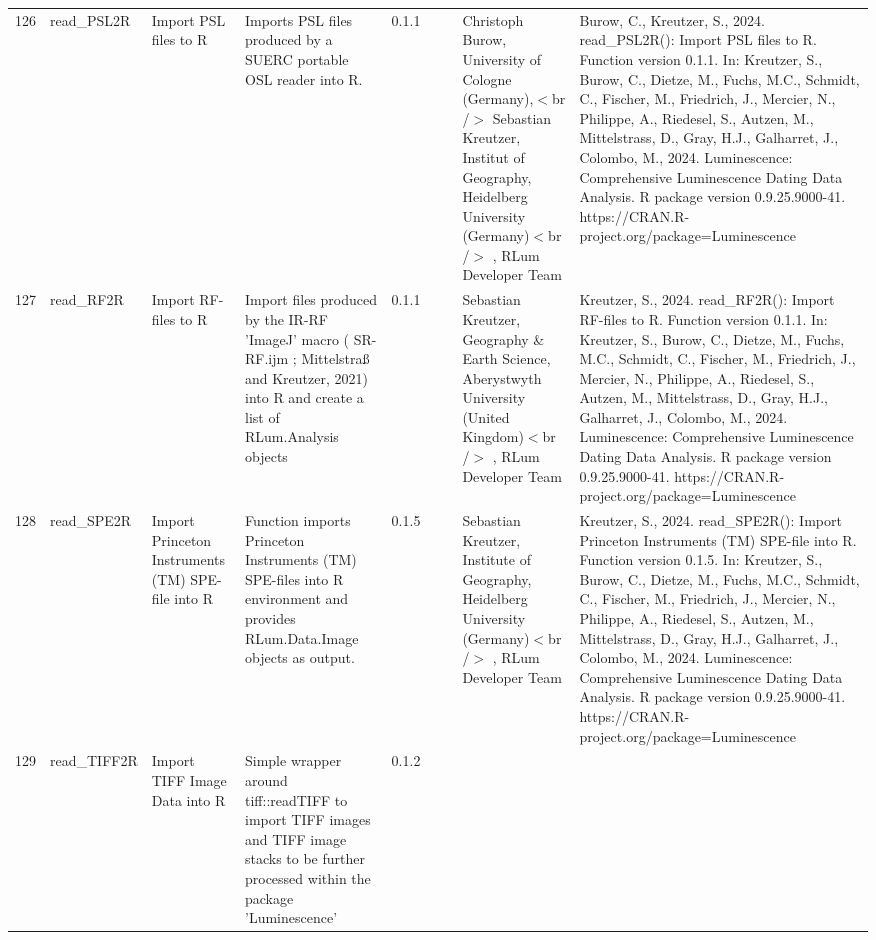 \begin{table}[ht]
\begin{tabular}{rllllllll}
 \\ 
  126 & read\_PSL2R & Import PSL files to R & Imports PSL files produced by a SUERC portable OSL reader into R. & 0.1.1
 &  &  & Christoph Burow, University of Cologne (Germany),$<$br /$>$ Sebastian Kreutzer, Institut of Geography, Heidelberg University (Germany)$<$br /$>$ , RLum Developer Team & Burow, C., Kreutzer, S., 2024. read\_PSL2R(): Import PSL files to R. Function version 0.1.1. In: Kreutzer, S., Burow, C., Dietze, M., Fuchs, M.C., Schmidt, C., Fischer, M., Friedrich, J., Mercier, N., Philippe, A., Riedesel, S., Autzen, M., Mittelstrass, D., Gray, H.J., Galharret, J., Colombo, M., 2024. Luminescence: Comprehensive Luminescence Dating Data Analysis. R package version 0.9.25.9000-41. https://CRAN.R-project.org/package=Luminescence
 \\ 
  127 & read\_RF2R & Import RF-files to R & Import files produced by the IR-RF 'ImageJ' macro ( SR-RF.ijm ; Mittelstraß and Kreutzer, 2021) into R and create a list of  RLum.Analysis  objects & 0.1.1
 &  &  & Sebastian Kreutzer, Geography \& Earth Science, Aberystwyth University (United Kingdom)$<$br /$>$ , RLum Developer Team & Kreutzer, S., 2024. read\_RF2R(): Import RF-files to R. Function version 0.1.1. In: Kreutzer, S., Burow, C., Dietze, M., Fuchs, M.C., Schmidt, C., Fischer, M., Friedrich, J., Mercier, N., Philippe, A., Riedesel, S., Autzen, M., Mittelstrass, D., Gray, H.J., Galharret, J., Colombo, M., 2024. Luminescence: Comprehensive Luminescence Dating Data Analysis. R package version 0.9.25.9000-41. https://CRAN.R-project.org/package=Luminescence
 \\ 
  128 & read\_SPE2R & Import Princeton Instruments (TM) SPE-file into R & Function imports Princeton Instruments (TM) SPE-files into R environment and provides  RLum.Data.Image  objects as output. & 0.1.5
 &  &  & Sebastian Kreutzer, Institute of Geography, Heidelberg University (Germany)$<$br /$>$ , RLum Developer Team & Kreutzer, S., 2024. read\_SPE2R(): Import Princeton Instruments (TM) SPE-file into R. Function version 0.1.5. In: Kreutzer, S., Burow, C., Dietze, M., Fuchs, M.C., Schmidt, C., Fischer, M., Friedrich, J., Mercier, N., Philippe, A., Riedesel, S., Autzen, M., Mittelstrass, D., Gray, H.J., Galharret, J., Colombo, M., 2024. Luminescence: Comprehensive Luminescence Dating Data Analysis. R package version 0.9.25.9000-41. https://CRAN.R-project.org/package=Luminescence
 \\ 
  129 & read\_TIFF2R & Import TIFF Image Data into R & Simple wrapper around  tiff::readTIFF  to import TIFF images and TIFF image stacks to be further processed within the package  'Luminescence' & 0.1.2

\end{tabular}
\end{table}
